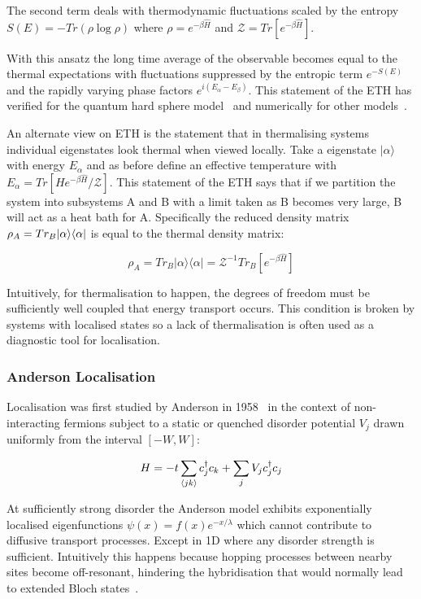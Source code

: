 The second term deals with thermodynamic fluctuations scaled by the entropy \(S(E) = -Tr(\rho \log \rho)\) where \(\rho = e^{-\beta \hat{H}}\) and \(\mathcal{Z} = Tr[e^{-\beta \hat{H}}]\).

With this ansatz the long time average of the observable becomes equal to the thermal expectations with fluctuations suppressed by the entropic term \(e^{-S(E)}\) and the rapidly varying phase factors \(e^{i(E_\alpha - E_\beta)}\). This statement of the ETH has verified for the quantum hard sphere model~\autocite{srednickiChaosQuantumThermalization1994} and numerically for other models~\autocite{khatamiFluctuationDissipationTheoremIsolated2013,dalessioQuantumChaosEigenstate2016}.

An alternate view on ETH is the statement that in thermalising systems individual eigenstates look thermal when viewed locally. Take a eigenstate \(|\alpha\rangle\) with energy \(E_\alpha\) and as before define an effective temperature with \(E_\alpha = Tr[H e^{-\beta \hat{H}}/\mathcal{Z}]\). This statement of the ETH says that if we partition the system into subsystems A and B with a limit taken as B becomes very large, B will act as a heat bath for A. Specifically the reduced density matrix \(\rho_A = Tr_B |\alpha\rangle \langle\alpha|\) is equal to the thermal density matrix:

\[\rho_A = Tr_B |\alpha\rangle \langle \alpha| = \mathcal{Z}^{-1} Tr_B [e^{-\beta \hat{H}}] \]

Intuitively, for thermalisation to happen, the degrees of freedom must be sufficiently well coupled that energy transport occurs. This condition is broken by systems with localised states so a lack of thermalisation is often used as a diagnostic tool for localisation.

\hypertarget{anderson-localisation}{%
\subsubsection{Anderson Localisation}\label{anderson-localisation}}

Localisation was first studied by Anderson in 1958~\autocite{andersonAbsenceDiffusionCertain1958} in the context of non-interacting fermions subject to a static or quenched disorder potential \(V_j\) drawn uniformly from the interval \([-W,W]\):

\[
H = -t\sum_{\langle jk \rangle} c^\dagger_j c_k + \sum_j V_j c_j^\dagger c_j
\]

At sufficiently strong disorder the Anderson model exhibits exponentially localised eigenfunctions \(\psi(x) = f(x) e^{-x/\lambda}\) which cannot contribute to diffusive transport processes. Except in 1D where any disorder strength is sufficient. Intuitively this happens because hopping processes between nearby sites become off-resonant, hindering the hybridisation that would normally lead to extended Bloch states~\autocite{kramerLocalizationTheoryExperiment1993}.

